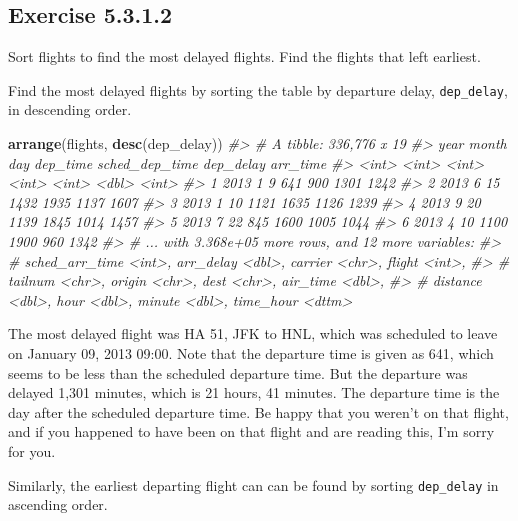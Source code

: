 \documentclass[]{book}
\newenvironment{Shaded}{\begin{snugshade}}{\end{snugshade}}
\newcommand{\CommentTok}[1]{\textcolor[rgb]{0.56,0.35,0.01}{\textit{#1}}}
\newcommand{\KeywordTok}[1]{\textcolor[rgb]{0.13,0.29,0.53}{\textbf{#1}}}
\newcommand{\NormalTok}[1]{#1}
\theoremstyle{plain}
\theoremstyle{remark}
\begin{document}
\hypertarget{exercise-5.3.1.2}{%
\subsection*{\texorpdfstring{Exercise {5.3.1.2}}{Exercise 5.3.1.2}}\label{exercise-5.3.1.2}}

Sort flights to find the most delayed flights. Find the flights that left earliest.

Find the most delayed flights by sorting the table by departure delay, \texttt{dep\_delay}, in descending order.

\begin{Shaded}
\begin{Highlighting}[]
\KeywordTok{arrange}\NormalTok{(flights, }\KeywordTok{desc}\NormalTok{(dep_delay))}
\CommentTok{#> # A tibble: 336,776 x 19}
\CommentTok{#>    year month   day dep_time sched_dep_time dep_delay arr_time}
\CommentTok{#>   <int> <int> <int>    <int>          <int>     <dbl>    <int>}
\CommentTok{#> 1  2013     1     9      641            900      1301     1242}
\CommentTok{#> 2  2013     6    15     1432           1935      1137     1607}
\CommentTok{#> 3  2013     1    10     1121           1635      1126     1239}
\CommentTok{#> 4  2013     9    20     1139           1845      1014     1457}
\CommentTok{#> 5  2013     7    22      845           1600      1005     1044}
\CommentTok{#> 6  2013     4    10     1100           1900       960     1342}
\CommentTok{#> # ... with 3.368e+05 more rows, and 12 more variables:}
\CommentTok{#> #   sched_arr_time <int>, arr_delay <dbl>, carrier <chr>, flight <int>,}
\CommentTok{#> #   tailnum <chr>, origin <chr>, dest <chr>, air_time <dbl>,}
\CommentTok{#> #   distance <dbl>, hour <dbl>, minute <dbl>, time_hour <dttm>}
\end{Highlighting}
\end{Shaded}

The most delayed flight was HA 51, JFK to HNL, which was scheduled to leave on January 09, 2013 09:00.
Note that the departure time is given as 641, which seems to be less than the scheduled departure time.
But the departure was delayed 1,301 minutes, which is 21 hours, 41 minutes.
The departure time is the day after the scheduled departure time.
Be happy that you weren't on that flight, and if you happened to have been on that flight and are reading this, I'm sorry for you.

Similarly, the earliest departing flight can can be found by sorting \texttt{dep\_delay} in ascending order.
\end{document}
